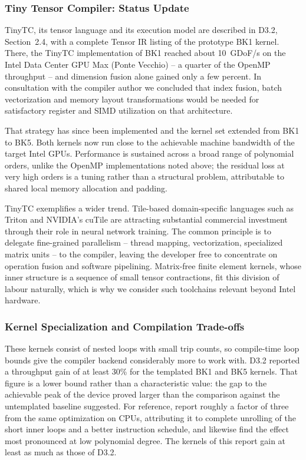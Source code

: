 \documentclass[a4paper,12pt]{article}
\begin{document}
\subsubsection{Tiny Tensor Compiler: Status Update}

TinyTC, its tensor language and its execution model are described in D3.2, Section~2.4, with a complete Tensor IR listing of the prototype BK1 kernel.
There, the TinyTC implementation of BK1 reached about 10~GDoF/s on the Intel Data Center GPU Max (Ponte Vecchio) -- a quarter of the OpenMP throughput -- and dimension fusion alone gained only a few percent.
In consultation with the compiler author we concluded that index fusion, batch vectorization and memory layout transformations would be needed for satisfactory register and SIMD utilization on that architecture.

That strategy has since been implemented and the kernel set extended from BK1 to BK5.
Both kernels now run close to the achievable machine bandwidth of the target Intel GPUs.
Performance is sustained across a broad range of polynomial orders, unlike the OpenMP implementations noted above; the residual loss at very high orders is a tuning rather than a structural problem, attributable to shared local memory allocation and padding.

TinyTC exemplifies a wider trend.
Tile-based domain-specific languages such as Triton and NVIDIA's cuTile are attracting substantial commercial investment through their role in neural network training.
The common principle is to delegate fine-grained parallelism -- thread mapping, vectorization, specialized matrix units -- to the compiler, leaving the developer free to concentrate on operation fusion and software pipelining.
Matrix-free finite element kernels, whose inner structure is a sequence of small tensor contractions, fit this division of labour naturally, which is why we consider such toolchains relevant beyond Intel hardware.

\subsubsection{Kernel Specialization and Compilation Trade-offs}

These kernels consist of nested loops with small trip counts, so compile-time loop bounds give the compiler backend considerably more to work with.
D3.2 reported a throughput gain of at least 30\% for the templated BK1 and BK5 kernels.
That figure is a lower bound rather than a characteristic value: the gap to the achievable peak of the device proved larger than the comparison against the untemplated baseline suggested.
For reference, \citet{Kronbichler19} report roughly a factor of three from the same optimization on CPUs, attributing it to complete unrolling of the short inner loops and a better instruction schedule, and likewise find the effect most pronounced at low polynomial degree.
The kernels of this report gain at least as much as those of D3.2.
\end{document}
